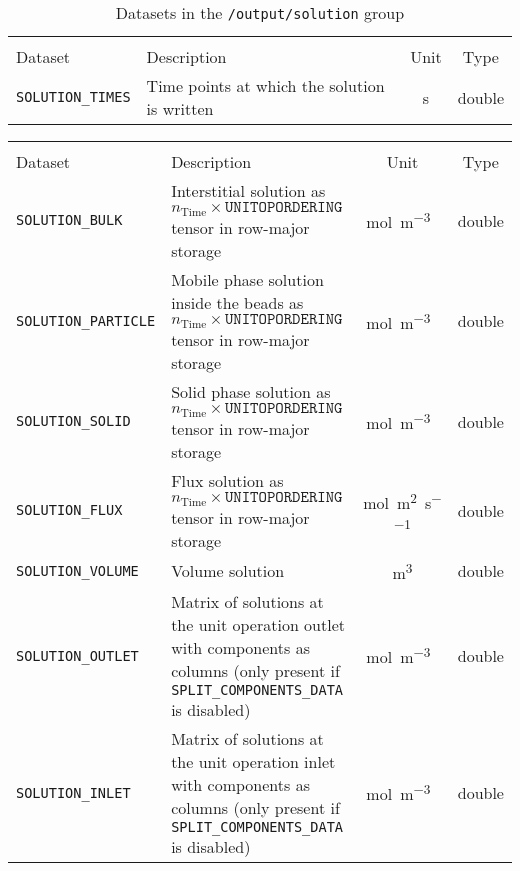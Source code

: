 \begin{table}[!ht]
\footnotesize
\begin{tabu}to \linewidth[m]{lX[m]cc} \toprule
{} \\
\rowfont[c]\normalfont Dataset & Description & Unit & Type \everyrow{\midrule}\\      
\texttt{SOLUTION\_TIMES} & Time points at which the solution is written & \si{\second} & double \everyrow{}\\
\bottomrule
\end{tabu}
\caption{\label{tab:FFOutputSolution}Datasets in the \texttt{/output/solution} group}
\end{table}

\begin{table}[!ht]
\footnotesize
\begin{tabu}to \linewidth[m]{lX[m]cc} \toprule
{} \\
\rowfont[c]\normalfont Dataset & Description & Unit & Type \everyrow{\midrule}\\      
\texttt{SOLUTION\_BULK} & Interstitial solution as $n_{\text{Time}} \times \texttt{UNITOPORDERING}$ tensor in row-major storage & \si{\mol\per\cubic\metre{}} & double \\
\texttt{SOLUTION\_PARTICLE} & Mobile phase solution inside the beads as $n_{\text{Time}} \times \texttt{UNITOPORDERING}$ tensor in row-major storage & \si{\mol\per\cubic\metre{}} & double \\
\texttt{SOLUTION\_SOLID} & Solid phase solution as $n_{\text{Time}} \times \texttt{UNITOPORDERING}$ tensor in row-major storage & \si{\mol\per\cubic\metre{}} & double \\
\texttt{SOLUTION\_FLUX} & Flux solution as $n_{\text{Time}} \times \texttt{UNITOPORDERING}$ tensor in row-major storage & \si{\mol\per\square\metre\per\second} & double \\
\texttt{SOLUTION\_VOLUME} & Volume solution & \si{\cubic\metre} & double \\
\texttt{SOLUTION\_OUTLET} & Matrix of solutions at the unit operation outlet with components as columns (only present if \texttt{SPLIT\_COMPONENTS\_DATA} is disabled) & \si{\mol\per\cubic\metre{}} & double \\
\texttt{SOLUTION\_INLET} & Matrix of solutions at the unit operation inlet with components as columns (only present if \texttt{SPLIT\_COMPONENTS\_DATA} is disabled) & \si{\mol\per\cubic\metre{}} & double \\

\end{tabu}
\end{table}
